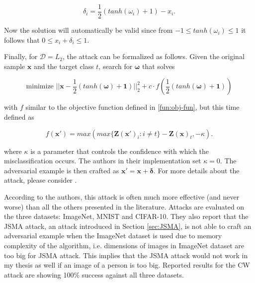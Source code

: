 \[
\delta_i = \frac{1}{2}(tanh(\omega_i) + 1) - x_i.
\] 

Now the solution will automatically be valid since from $-1 \leq tanh(\omega_i) \leq 1$ it follows that $0 \leq x_i + \delta_i \leq 1$.

Finally, for $\mathcal{D} = L_2$, the attack can be formalized as follows. Given the original sample $\pmb x$ and the target class $t$, search for $\pmb \omega$ that solves

\[
\text{minimize  }||\pmb x - \frac{1}{2}(tanh(\pmb \omega) + \pmb 1)||_2^2 + c \cdot  f(\frac{1}{2}(tanh(\pmb \omega) + \pmb 1))
\]

with $f$ similar to the objective function defined in \ref{fun:obj-fun}, but this time defined as

\[
f(\pmb x') = max(max\{\pmb Z(\pmb x ')_i : i \neq t\} - \pmb Z(\pmb x)_t, - \kappa).
\]

where $\kappa$ is a parameter that controls the confidence with which the misclassification occurs. The authors in their implementation set $\kappa = 0$. The adversarial example is then crafted as $\pmb x' = \pmb x + \pmb \delta$. For more details about the attack, please consider \cite{DBLP:journals/corr/CarliniW16a}.

According to the authors, this attack is often much more effective (and never worse) than all the others presented in the literature. Attacks are evaluated on the three datasets: ImageNet, MNIST and CIFAR-10. They also report that the JSMA attack, an attack introduced in Section \ref{sec:JSMA}, is not able to craft an adversarial example when the ImageNet dataset is used due to memory complexity of the algorithm, i.e. dimensions of images in ImageNet dataset are too big for JSMA attack. This implies that the JSMA attack would not work in my thesis as well if an image of a person is too big. Reported results for the CW attack are showing 100\% success against all three datasets.







